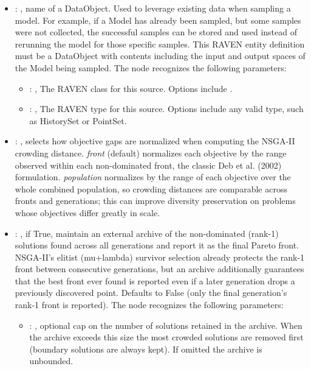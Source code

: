 \begin{itemize}
    \item {}: ,
      name of a DataObject. Used to leverage existing data when sampling a model. For
      example, if a Model has               already been sampled, but some samples were not
      collected, the successful samples can               be stored and used instead of rerunning
      the model for those specific samples. This RAVEN               entity definition must be a
      DataObject with contents including the input and output spaces               of the Model
      being sampled.
      The  node recognizes the following parameters:
        \begin{itemize}
          \item {}: ,
            The RAVEN class for this source. Options include .
          \item {}: ,
            The RAVEN type for this source. Options include any valid  type,
            such as HistorySet or PointSet.
      \end{itemize}

    \item {}: ,
      selects how objective gaps are normalized when computing the NSGA-II crowding distance.
      \textit{front} (default) normalizes each objective by the range observed within each
      non-dominated front, the classic Deb et al. (2002) formulation. \textit{population}
      normalizes by the range of each objective over the whole combined population, so crowding
      distances are comparable across fronts and generations; this can improve diversity
      preservation on problems whose objectives differ greatly in scale.

    \item {}: ,
      if True, maintain an external archive of the non-dominated (rank-1) solutions found
      across all generations and report it as the final Pareto front. NSGA-II's elitist
      (mu+lambda) survivor selection already protects the rank-1 front between consecutive
      generations, but an archive additionally guarantees that the best front ever found is
      reported even if a later generation drops a previously discovered point. Defaults to
      False (only the final generation's rank-1 front is reported).
      The  node recognizes the following parameters:
        \begin{itemize}
          \item {}: ,
            optional cap on the number of solutions retained in the archive. When the archive
            exceeds this size the most crowded solutions are removed first (boundary solutions are
            always kept). If omitted the archive is unbounded.
      \end{itemize}


\end{itemize}

